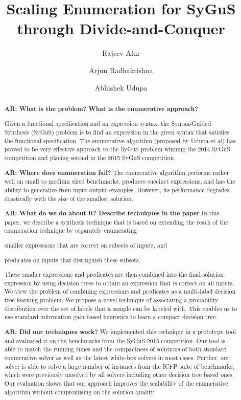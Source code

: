 \documentclass{llncs}
\newcommand\arsays[1]{{\bf AR: #1}}
\begin{document}
\title{Scaling Enumeration for SyGuS through Divide-and-Conquer}
\author{Rajeev Alur \and Arjun Radhakrishna \and Abhishek Udupa}
\maketitle

\begin{abstract}
  \arsays{What is the problem? What is the enumerative approach?}

  Given a functional specification and an expression syntax, the
  Syntax-Guided Synthesis (SyGuS) problem is to find an expression in
  the given syntax that satisfies the functional specification.
  The enumerative algorithm (proposed by Udupa et al) has proved to be
  very effective approach to the SyGuS problem winning the 2014 SyGuS
  competition and placing second in the 2015 SyGuS competition.

  \arsays{Where does enumeration fail?}
  The enumerative algorithm performs rather well on small to
  medium sized benchmarks, produces succinct expressions, and has the
  ability to generalize from input-output examples.
  However, its performance degrades drastically with the size of the
  smallest solution.

  \arsays{What do we do about it? Describe techniques in the paper}
  In this paper, we describe a synthesis technique that is based on
  extending the reach of the enumeration technique by separately
  enumerating
  \begin{inparaenum}[(a)]
  \item smaller expressions that are correct on subsets of inputs, and
  \item predicates on inputs that distinguish these subsets.
  \end{inparaenum}
  These smaller expressions and predicates are then combined into the
  final solution expression by using decision trees to obtain an
  expression that is correct on all inputs.
  We view the problem of combining expressions and predicates as a multi-label
  decision tree learning problem. We propose a novel technique of
  associating a probability distribution over the set of labels that a
  sample can be labeled with. This enables us to use standard
  information gain based heuristics to learn a compact decision tree.

  \arsays{Did our techniques work?}
  We implemented this technique in a prototype tool and evaluated it on
  the benchmarks from the SyGuS 2015 competition.
  Our tool is able to match the running times and the compactness of
  solutions of both standard enumerative solver as well as the latest
  white-box solvers in most cases.
  Further, our solver is able to solve a large number of instances from
  the ICFP suite of benchmarks, which were previously unsolved by all
  solvers including other decision tree based ones.
  Our evaluation shows that our approach improves the scalability of the
  enumerative algorithm without compromising on the solution quality.
\end{abstract}
\end{document}
